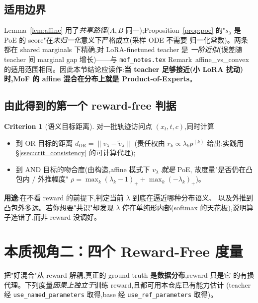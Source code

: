 \documentclass[11pt,a4paper]{article}
\newcommand{\resp}{r}
\theoremstyle{definition}
\newtheorem{criterion}{Criterion}
\begin{document}
\subsection{适用边界}
\label{ssec:shared_marginal}

Lemma~\ref{lem:affine} 用了\emph{共享路径}($A,B$ 同一);Proposition~\ref{prop:poe}
的"$s_\lambda$ 是 PoE 的 score"在\emph{未归一化}意义下严格成立(采样 ODE 不需要
归一化常数)。两条都在 shared marginals 下精确,对 LoRA-finetuned teacher 是
\emph{一阶近似}(误差随 teacher 间 marginal gap 增长)——与 \texttt{mof\_notes.tex}
Remark~affine\_vs\_convex 的适用范围相同。因此本节结论应读作:\textbf{当 teacher
足够接近(小 LoRA 扰动)时,MoF 的 affine 混合在分布上就是 Product-of-Experts}。

\subsection{由此得到的第一个 reward-free 判据}
\label{ssec:crit_semantic}

\begin{criterion}[语义目标距离]
\label{crit:semantic}
对一批轨迹访问点 $(x_t,t,c)$,同时计算
\begin{itemize}[leftmargin=1.5em]
\item 到 OR 目标的距离 $d_{\text{OR}}=\|v_\lambda-\tilde v_\lambda\|$
(责任权由 $\resp_k\propto\lambda_k p^{(k)}$ 给出;实践用 \S\ref{ssec:crit_consistency}
的可计算代理);
\item 到 AND 目标的吻合度(由构造,affine 模式下 $v_\lambda$ \emph{就是} PoE,
故度量"是否仍在凸包内 / 外推幅度" $\rho=\max_k(\lambda_k-1)_+ + \max_k(-\lambda_k)_+$)。
\end{itemize}
\textbf{用途}:在不看 reward 的前提下,判定当前 $\lambda$ 到底在逼近哪种分布语义、
以及外推到凸包外多远。若你想要"共识"却发现 $\lambda$ 停在单纯形内部(softmax
的天花板),说明算子选错了,而非 reward 没调好。
\end{criterion}

\section{本质视角二：四个 Reward-Free 度量}
\label{sec:metrics}

把"好混合"从 reward 解耦,真正的 ground truth 是\textbf{数据分布},reward 只是它
的有损代理。下列度量\emph{因果上独立于}训练 reward,且都可用本仓库已有能力估计
(teacher 经 \texttt{use\_named\_parameters} 取得,base 经 \texttt{use\_ref\_parameters}
取得)。
\end{document}
